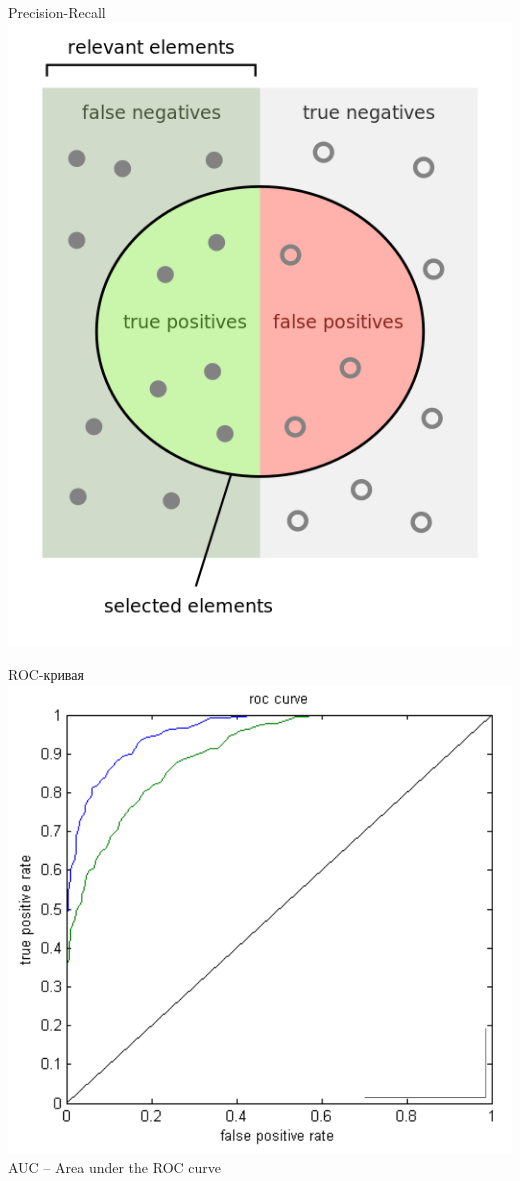 \documentclass[10pt]{beamer}
\begin{document}
\begin{frame}{Precision-Recall}
	\centering
	\includegraphics[width=\textwidth, height=0.9 \textheight, keepaspectratio]{images/precisionrecall}
\end{frame}

{
\begin{frame}{ROC-кривая}
  \centering
  \includegraphics[height=0.7 \textheight, keepaspectratio = true]{images/roc}   \\
  AUC -- Area under the ROC curve
\end{frame}
}
\end{document}
